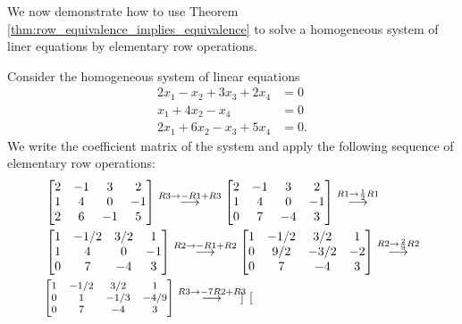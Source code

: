 \documentclass[12pt,letterpaper,reqno]{article}
\numberwithin{equation}{section}
\begin{document}
\begin{example} We now demonstrate how to use 
	Theorem \ref{thm:row_equivalence_implies_equivalence} to solve a homogeneous system of liner equations by elementary row operations. 
	
	Consider the homogeneous system of linear equations
	\begin{equation}\label{eq:hom_ex_original}
	\begin{split}
2x_1-x_2+3x_3+2x_4 &=0 \\
x_1+4x_2-x_4&=0 \\
2x_1+6x_2-x_3+5x_4 &=0.
	\end{split}
	\end{equation}
We write the coefficient matrix of the system and apply the following sequence of elementary row operations:
\begin{align*}
	&\begin{bmatrix}
		2&-1&3&2 \\ 1 & 4 & 0 & -1 \\2 & 6 & -1 & 5
	\end{bmatrix} \stackrel{\footnotesize{R3 \to -R1+R3}}{\longrightarrow}	\begin{bmatrix}
		2&-1&3&2 \\ 1 & 4 & 0 & -1 \\0&7&-4&3
	\end{bmatrix}\stackrel{\footnotesize{R1 \to \frac{1}{2}R1}}{\longrightarrow} \\
	&\begin{bmatrix}
		1&-1/2&3/2&1 \\ 1 & 4 & 0 & -1 \\0&7&-4&3
	\end{bmatrix}\stackrel{\footnotesize{R2 \to -R1+R2}}{\longrightarrow} \begin{bmatrix}
		1&-1/2&3/2&1 \\ 0 & 9/2 & -3/2 & -2 \\0&7&-4&3
	\end{bmatrix} \stackrel{\footnotesize{R2 \to \frac{2}{9}R2}}{\longrightarrow} \\
	&{\footnotesize\begin{bmatrix}
		1&-1/2&3/2&1 \\ 0 & 1 & -1/3 & -4/9 \\0&7&-4&3
	\end{bmatrix}} \stackrel{\footnotesize{R3 \to -7R2+R3}}{\longrightarrow} {\footnotesize \begin{bmatrix}

\end{bmatrix}}
\end{align*}
\end{example}
\end{document}
